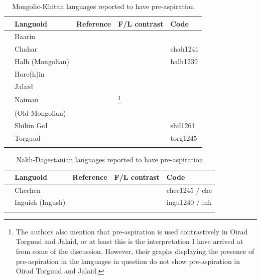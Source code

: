 \documentclass[output=paper]{langscibook}
\begin{document}
\begin{paperappendix}
\begin{table}
\begin{tabularx}{\textwidth}{@{}l@{}QQQl}
\lsptoprule
& Languoid & Reference & F/L contrast & Code\\
\midrule
  & Baarin & \citet{KarlssonSvantesson2012} & \citet{KarlssonSvantesson2011} & \\
& Chahar & \citet[17]{svantesson2005} &  & chah1241\\
& Halh (Mongolian) & \citet[17]{svantesson2005} & \citet{KarlssonSvantesson2011} & halh1239\\
& Horc(h)in & \citet{KarlssonSvantesson2012} & \citet{KarlssonSvantesson2011} & \\
& Jalaid &  \citet[7]{KarlssonSvantesson2012} &  & \\
& Naiman & \citet{KarlssonSvantesson2012} & \citet{KarlssonSvantesson2012} \footnote{The authors also mention that pre-aspiration is used contrastively in Oirad Torguud and Jalaid, or at least this is the interpretation I have arrived at from some of the discussion. However, their graphs displaying the presence of pre-aspiration in the languages in question do not show pre-aspiration in Oirad Torguud and Jalaid.} & \\
& (Old Mongolian) & \citet{KarlssonSvantesson2012} &  & \\
& Shiliin Gol & \citet{KarlssonSvantesson2012} & \citet{KarlssonSvantesson2011} & shil1261\\
& Torguud &   \citet[7]{KarlssonSvantesson2012} &  & torg1245\\
\lspbottomrule
\end{tabularx}
\caption{Mongolic-Khitan languages reported to have pre-aspiration}
\label{tab:key:6}
\end{table}


\begin{table}
\begin{tabularx}{\textwidth}{@{}l@{}QQQl}
\lsptoprule
& Languoid & Reference & F/L contrast & Code\\
\midrule
 & Chechen & \citet[114]{Catford1977} &  & chec1245 / che\\
& Inguish (Ingush) & \citet[114]{Catford1977} &  & ingu1240 / ink\\
\lspbottomrule
\end{tabularx}
\caption{Nakh-Dagestanian languages reported to have pre-aspiration}
\label{tab:key:7}
\end{table}



\end{paperappendix}
\end{document}
